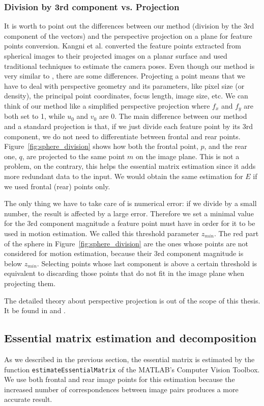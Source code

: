 \subsubsection{Division by 3rd component vs. Projection}
It is worth to point out the differences between our method (division by the 3rd 
component of the vectors) and the perspective projection on a plane for feature
points conversion. Kangni et al. \cite{kangni2007orientation} converted the 
feature points extracted from spherical images to their projected images on a 
planar surface and used traditional techniques to estimate the camera poses.
Even though our method is very similar to \cite{kangni2007orientation}, there 
are some differences.
Projecting a point means that we have to deal with perspective geometry and its
parameters, like pixel size (or density), the principal point coordinates, 
focus length, image size, etc.
We can think of our method like a simplified perspective projection where
$f_x$ and $f_y$ are both set to 1, while $u_0$ and $v_0$ are 0.
The main difference between our method and a standard projection is that, if we
just divide each feature point by its 3rd component, we do not need to 
differentiate between frontal and rear points.
Figure~\ref{fig:sphere_division} shows how both the frontal point, $p$, and the 
rear one, $q$, are projected to the same point $m$ on the image plane.
This is not a problem, on the contrary, this helps the essential matrix 
estimation since it adds more redundant data to the input. We would obtain the
same estimation for $E$ if we used frontal (rear) points only.

The only thing we have to take care of is numerical error: if we divide by a 
small number, the result is affected by a large error. Therefore we
set a minimal value for the 3rd component magnitude a feature point must 
have in order for it to be used in motion estimation. 
We called this threshold parameter $z_{min}$.
The red part of the sphere in Figure~\ref{fig:sphere_division} are the ones
whose points are not considered for motion estimation, because their 
3rd component magnitude is below $z_{min}$.
Selecting points whose last component is above a certain threshold is 
equivalent to discarding those points that do not fit in the image plane
when projecting them.

The detailed theory about perspective projection is out of the scope of this 
thesis. It be found in \cite{szeliski2010computer} and \cite{Hartley2004}.

\subsection{Essential matrix estimation and decomposition}
As we described in the previous section, the essential matrix is estimated 
by the function {\tt estimateEssentialMatrix} of the MATLAB's 
Computer Vision Toolbox.
We use both frontal and rear image points for this estimation because
the increased number of correspondences between image pairs produces 
a more accurate result.

